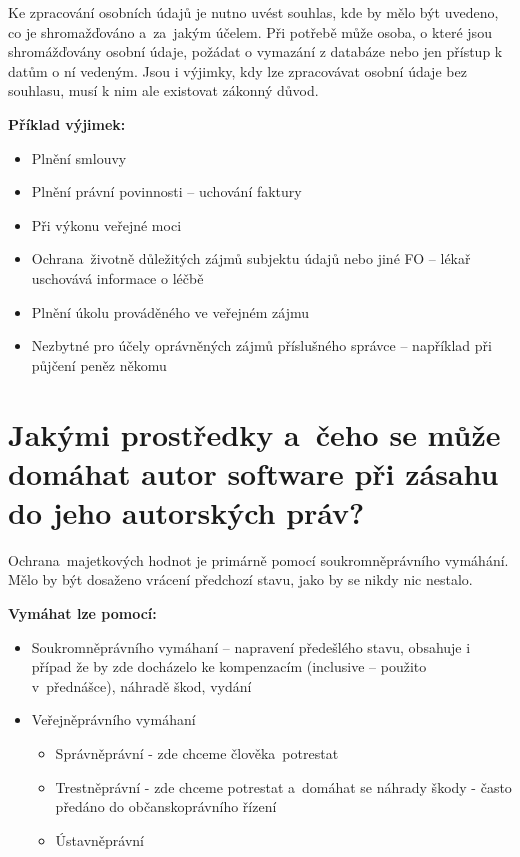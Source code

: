 Ke zpracování osobních údajů je nutno uvést souhlas, kde by mělo být uvedeno, co je shromažďováno a~za~jakým účelem. Při potřebě může osoba, o které jsou shromážďovány osobní údaje, požádat o vymazání z databáze nebo jen přístup k datům o ní vedeným. Jsou i výjimky, kdy lze zpracovávat osobní údaje bez souhlasu, musí k nim ale existovat zákonný důvod.

\newpage
\noindent\textbf{Příklad výjimek:}
\begin{itemize}[noitemsep]
    \item Plnění smlouvy
    \item Plnění právní povinnosti -- uchování faktury
    \item Při výkonu veřejné moci
    \item Ochrana~životně důležitých zájmů subjektu údajů nebo jiné FO -- lékař uschovává informace o léčbě
    \item Plnění úkolu prováděného ve veřejném zájmu
    \item Nezbytné pro účely oprávněných zájmů příslušného správce -- například při půjčení peněz někomu
\end{itemize}


\section{Jakými prostředky a~čeho se může domáhat autor software při zásahu do jeho autorských práv?}

Ochrana~majetkových hodnot je primárně pomocí soukromněprávního vymáhání. Mělo by být dosaženo vrácení předchozí stavu, jako by se nikdy nic nestalo.
\newline

\noindent\textbf{Vymáhat lze pomocí:}
\begin{itemize}[noitemsep]
    \item Soukromněprávního vymáhaní -- napravení předešlého stavu, obsahuje i případ že by zde docházelo ke kompenzacím (inclusive -- použito v~přednášce), náhradě škod, vydání
    \item Veřejněprávního vymáhaní
          \begin{itemize}[noitemsep]
              \item Správněprávní - zde chceme člověka~potrestat
              \item Trestněprávní - zde chceme potrestat a~domáhat se náhrady škody - často předáno do občanskoprávního řízení
              \item Ústavněprávní
          \end{itemize}
\end{itemize}

